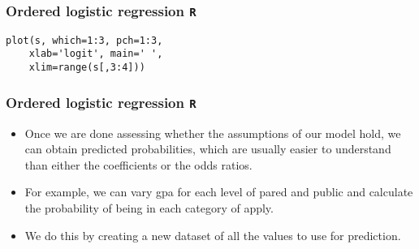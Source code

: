 \documentclass[00-GLMregslides.tex]{subfiles}
\begin{document}

\begin{frame}[fragile]
	\frametitle{Ordered logistic regression \texttt{R} }
	\Large
\begin{framed}
\begin{verbatim}
plot(s, which=1:3, pch=1:3, 
    xlab='logit', main=' ', 
    xlim=range(s[,3:4]))
\end{verbatim}
\end{framed}
\end{frame}

\begin{frame}[fragile]
	\frametitle{Ordered logistic regression \texttt{R} }
	\Large
	

\begin{itemize}
\item Once we are done assessing whether the assumptions of our model hold, we can obtain predicted probabilities, which are usually easier to understand than either the coefficients or the odds ratios. 

\item For example, we can vary gpa for each level of pared and public and calculate the probability of being in each category of apply. 
\item We do this by creating a new dataset of all the values to use for prediction.
\end{itemize}
\end{frame}
\end{document}
